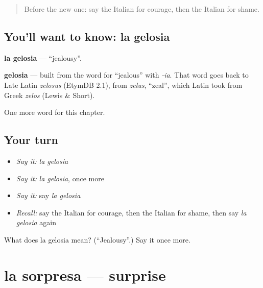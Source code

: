 \label{lesson:IT-C216-gelosia}



\begin{quote}
Before the new one: say the Italian for courage, then the Italian for shame.
\end{quote}

\subsection*{You'll want to know: la gelosia}
\textbf{la gelosia} — \textquotedblleft{}jealousy\textquotedblright{}.

\begin{cousinweb}
\textbf{gelosia} — built from the word for \textquotedblleft{}jealous\textquotedblright{} with \emph{-ia}. That word goes back to Late Latin \emph{zelosus} (EtymDB 2.1), from \emph{zelus}, \textquotedblleft{}zeal\textquotedblright{}, which Latin took from Greek \emph{zelos} (Lewis \& Short).
\end{cousinweb}

\begin{grammarlens}[title={What you've built}]
One more word for this chapter.
\end{grammarlens}

\subsection*{Your turn}
\begin{itemize}
\raggedright
  \item \emph{Say it:} \emph{la gelosia}
  \item \emph{Say it:} \emph{la gelosia}, once more
  \item \emph{Say it:} say \emph{la gelosia}
  \item \emph{Recall:} say the Italian for courage, then the Italian for shame, then say \emph{la gelosia} again
\end{itemize}

\begin{tcolorbox}[breakable,colback=teal!4,colframe=teal!35!black,title={Before you move on}]
What does la gelosia mean? (\textquotedblleft{}Jealousy\textquotedblright{}.) Say it once more.
\end{tcolorbox}
\section[la sorpresa]{la sorpresa — surprise}

